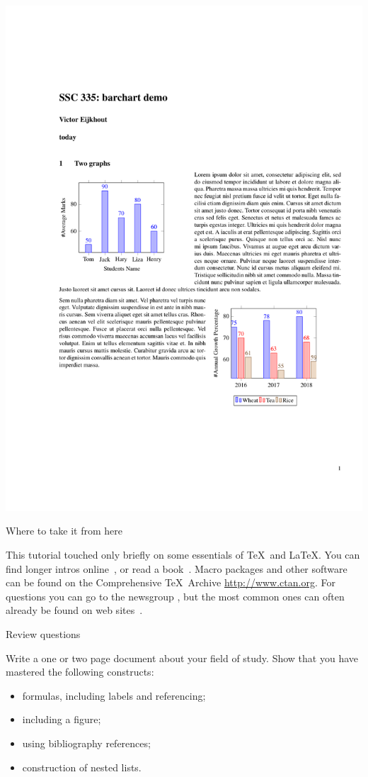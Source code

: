 \includegraphics[scale=.75]{code/latexdemo/barchart}

 {Where to take it from here}
\label{sec:moreLaTeX}

This tutorial touched only briefly on some essentials of \TeX\ and
\LaTeX. You can find longer intros online~\cite{Oetiker:LaTeXintro},
or read a book~\cite{Lamport:LaTeX,KopkaDaly,LaTeXcompanion}. Macro
packages and other software can be found on the Comprehensive
\TeX\ Archive \url{http://www.ctan.org}. For questions you can go to
the newsgroup , but the most common ones can often
already be found on web sites~\cite{UKTeXFAQ}.

 {Review questions}

\begin{exercise}
\label{ex:latex-doc}
Write a one or two page document about your field of study. Show that
you have mastered the following constructs:
\begin{itemize}
\item formulas, including labels and referencing;
\item including a figure;
\item using bibliography references;
\item construction of nested lists.
\end{itemize}
\end{exercise}

